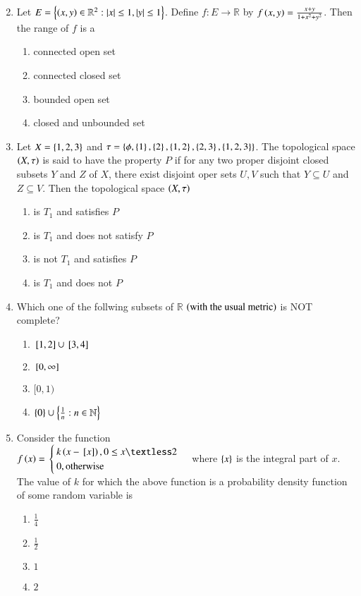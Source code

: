 \documentclass[journal]{IEEEtran}
\begin{document}
\begin{enumerate}
{\begin{multicols}{2}
\end{multicols}
}
\item{
Let $E=\left\{\left(x,y\right)\in\mathbb{R}^2:\left\vert x\right\vert\leq 1,\left\vert y\right\vert\leq 1\right\}$. Define $f:E\rightarrow\mathbb{R}$ by $f\left(x,y\right)=\frac{x+y}{1+x^2+y^2}$. Then the range of $f$ is a
\begin{enumerate}
\item connected open set
\item connected closed set
\item bounded open set
\item closed and unbounded set
\end{enumerate}
}
\item{
Let $X=\left\{1,2,3\right\}$ and $\tau=\left\{\phi,\left\{1\right\},\left\{2\right\},\left\{1,2\right\},\left\{2,3\right\},\left\{1,2,3\right\}\right\}$. The topological space $\left(X,\tau\right)$ is said to have the property $P$ if for any two proper disjoint closed subsets $Y$ and $Z$ of $X$, there exist disjoint oper sets $U,V$ such that $Y\subseteq U$ and $Z\subseteq V$. Then the topological space $\left(X,\tau\right)$
\begin{multicols}{2}
\begin{enumerate}
\item is $T_1$ and satisfies $P$
\item is $T_1$ and does not satisfy $P$
\item is not $T_1$ and satisfies $P$
\item is $T_1$ and does not $P$
\end{enumerate}
\end{multicols}
}
\item{
Which one of the follwing subsets of $\mathbb{R}$ $\left(\text{with the usual metric}\right)$ is NOT complete?
\begin{multicols}{4}
\begin{enumerate}
    \item ${}\left[1,2\right]\cup{}\left[3,4\right]$
    \item ${}\left[0,\infty\right]$
    \item $[0,1)$
    \item $\left\{0\right\}\cup\left\{\frac{1}{n}:n\in\mathbb{N}\right\}$
\end{enumerate}
\end{multicols}
}
\item{
Consider the function\\
$f\left(x\right)=$
$\begin{cases}
k\brak{x-\sbrak{x}}, 0\leq x\textless 2\\
0, \text{otherwise}
\end{cases}$
where $\left\{x\right\}$ is the integral part of $x$. The value of $k$ for which the above function is a probability density function of some random variable is
\begin{multicols}{4}
\begin{enumerate}
    \item $\frac{1}{4}$
    \item $\frac{1}{2}$
    \item $1$
    \item $2$
\end{enumerate}
\end{multicols}
}
\end{enumerate}
\end{document}
